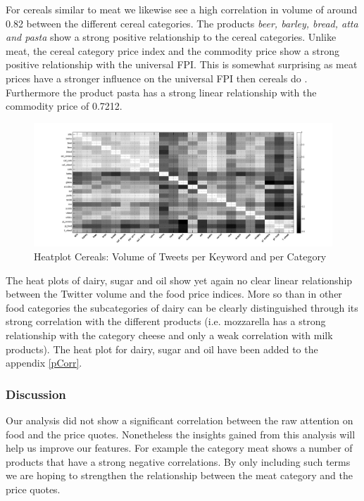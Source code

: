 For cereals similar to meat we likewise see a high correlation in volume of around 0.82 between the different cereal categories. The products \emph{beer, barley, bread, atta and pasta} show a strong positive relationship to the cereal categories. Unlike meat, the cereal category price index and the commodity price show a strong positive relationship with the universal FPI. This is somewhat surprising as meat prices have a stronger influence on the universal FPI then cereals do \cite{fao2008}. Furthermore the product pasta has a strong linear relationship with the commodity price of 0.7212.
\begin{figure}[H]
        \centering
         \includegraphics[width=1\textwidth ]{img/anal/black_cereals}
              
        \caption{Heatplot Cereals: Volume of Tweets per Keyword and per Category}
        \label{fig:distribution}
\end{figure}
 

The heat plots of dairy, sugar and oil show yet again no clear linear relationship between the Twitter volume and the food price indices. More so than in other food categories the subcategories of dairy can be clearly distinguished through its strong correlation with the different products (i.e. mozzarella has a strong relationship with the category cheese and only a weak correlation with milk products). The heat plot for dairy, sugar and oil have been added to the appendix \ref{pCorr}.



\subsubsection{Discussion} 

Our analysis did not show a significant correlation between the raw attention on food and the price quotes.
Nonetheless the insights gained from this analysis will help us improve our features. For example the category meat shows a number of products that have a strong negative correlations. By only including such terms we are hoping to strengthen the relationship between the meat category and the price quotes.

